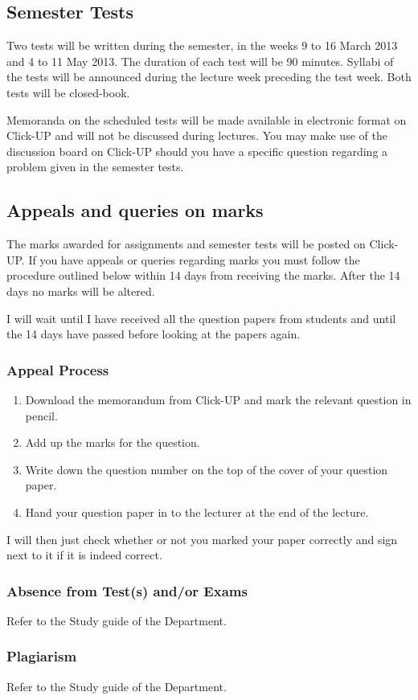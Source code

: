     \subsection{Semester Tests}
        Two tests will be written during the semester, in the weeks 9 to 16 March
        2013 and 4 to 11 May 2013. The duration of each test will be 90 minutes.
        Syllabi of the tests will be announced during the lecture week preceding 
        the test week. Both tests will be closed-book.
        
        Memoranda on the scheduled tests will be made available in electronic 
        format on Click-UP and will not be discussed during lectures. You may
        make use of the discussion board on Click-UP should you have a specific
        question regarding a problem given in the semester tests.

    \subsection{Appeals and queries on marks}
        The marks awarded for assignments and semester tests will be
        posted on Click-UP. If you have appeals or queries regarding marks
        you must follow the procedure outlined below within 14 days from
        receiving the marks. After the 14 days no marks will be altered.

        I will wait until I have received all the question papers from
        students and until the 14 days have passed before looking at the
        papers again.

        \subsubsection{Appeal Process}
            \begin{enumerate}
                \item Download the memorandum from Click-UP and mark the relevant
                      question in pencil.
                \item Add up the marks for the question.
                \item Write down the question number on the top of the cover of 
                      your question paper.
                \item Hand your question paper in to the lecturer at the end of
                      the lecture.
            \end{enumerate}

            I will then just check whether or not you marked your paper
            correctly and sign next to it if it is indeed correct.
        
        \subsubsection{Absence from Test(s) and/or Exams}
            Refer to the Study guide of the Department.
        
        \subsubsection{Plagiarism}
            Refer to the Study guide of the Department.




